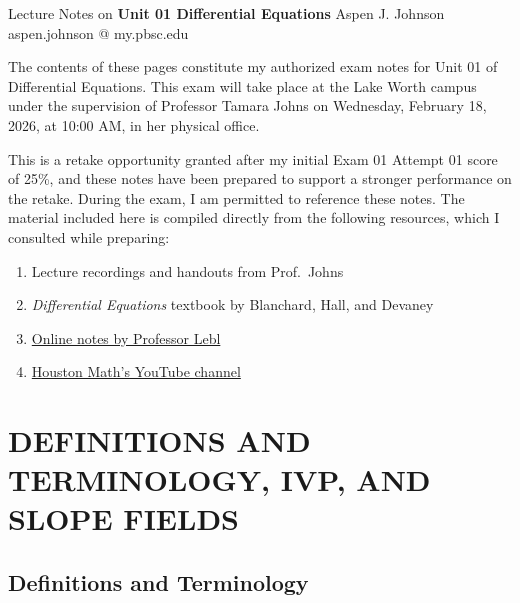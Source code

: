 \documentclass[11pt]{article}
\begin{document}
\thispagestyle{empty}
\bigskip
\vspace{0.1cm}

\begin{center}
{\fontsize{22}{22}\selectfont Lecture Notes on}
\vskip 16pt
{\fontsize{25}{25}\selectfont \bf \sffamily Unit 01 Differential Equations}
\vskip 24pt
{\fontsize{18}{18}\selectfont \rmfamily Aspen J. Johnson}
\vskip 6pt
{\fontsize{14}{14}\selectfont \ttfamily aspen.johnson @ my.pbsc.edu}
\vskip 24pt
\end{center}

{\parindent0pt \baselineskip=15.5pt}

The contents of these pages constitute my authorized exam notes for Unit 01 of Differential Equations. This exam will take place at the
Lake Worth campus under the supervision of Professor Tamara Johns on Wednesday, February 18, 2026, at 10:00 AM, in her physical office.

This is a retake opportunity granted after my initial Exam 01 Attempt 01 score of 25\%, and these notes have been prepared to support a stronger
performance on the retake. During the exam, I am permitted to reference these notes. The material included here is compiled directly from the following
resources, which I consulted while preparing:

\begin{enumerate}
    \item Lecture recordings and handouts from Prof.\ Johns
    \item \emph{Differential Equations} textbook by Blanchard, Hall, and Devaney
    \item \href{https://www.jirka.org/diffyqs/html/fo_chapter.html}{Online notes by Professor Lebl}
    \item \href{https://youtube.com/playlist?list=PLbYOkEbzW902GJZswbMnWHQaP4kKMS2TV&si=WetwPhjknIVybtdj}{Houston Math's YouTube channel}
\end{enumerate}

\newpage
\microtoc
\newpage


\section{DEFINITIONS AND TERMINOLOGY, IVP, AND SLOPE FIELDS}
\subsection{Definitions and Terminology}
\end{document}
